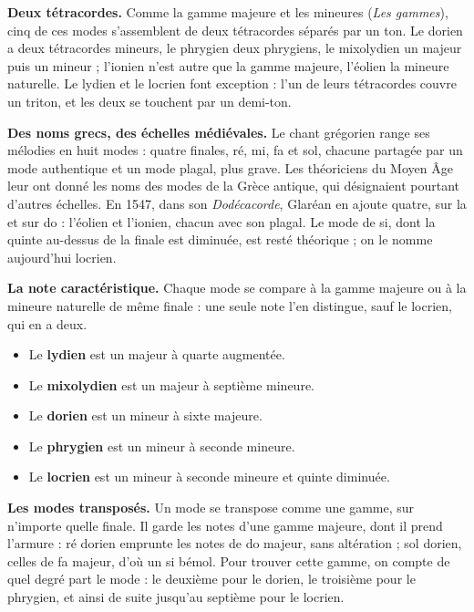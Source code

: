 \documentclass[a4paper,11pt]{article}
\begin{document}
\textbf{Deux tétracordes.} Comme la gamme majeure et les mineures
(\emph{Les gammes}), cinq de ces modes s'assemblent de deux tétracordes
séparés par un ton. Le dorien a deux tétracordes mineurs, le phrygien deux
phrygiens, le mixolydien un majeur puis un mineur ; l'ionien n'est autre que la
gamme majeure, l'éolien la mineure naturelle. Le lydien et le locrien font
exception : l'un de leurs tétracordes couvre un triton, et les deux se touchent
par un demi-ton.

\begin{remarque}
\textbf{Des noms grecs, des échelles médiévales.} Le chant grégorien range
ses mélodies en huit modes : quatre finales, ré, mi, fa et sol, chacune
partagée par un mode authentique et un mode plagal, plus grave. Les
théoriciens du Moyen Âge leur ont donné les noms des modes de la Grèce
antique, qui désignaient pourtant d'autres échelles. En 1547, dans son
\emph{Dodécacorde}, Glaréan en ajoute quatre, sur la et sur do : l'éolien et
l'ionien, chacun avec son plagal. Le mode de si, dont la quinte au-dessus de la
finale est diminuée, est resté théorique ; on le nomme aujourd'hui locrien.
\end{remarque}

\textbf{La note caractéristique.} Chaque mode se compare à la gamme majeure ou
à la mineure naturelle de même finale : une seule note l'en distingue, sauf le
locrien, qui en a deux.
\begin{itemize}
  \item Le \textbf{lydien} est un majeur à quarte augmentée.
  \item Le \textbf{mixolydien} est un majeur à septième mineure.
  \item Le \textbf{dorien} est un mineur à sixte majeure.
  \item Le \textbf{phrygien} est un mineur à seconde mineure.
  \item Le \textbf{locrien} est un mineur à seconde mineure et quinte diminuée.
\end{itemize}

\textbf{Les modes transposés.} Un mode se transpose comme une gamme, sur
n'importe quelle finale. Il garde les notes d'une gamme majeure, dont il prend
l'armure : ré dorien emprunte les notes de do majeur, sans altération ; sol
dorien, celles de fa majeur, d'où un si bémol. Pour trouver cette gamme, on
compte de quel degré part le mode : le deuxième pour le dorien, le troisième
pour le phrygien, et ainsi de suite jusqu'au septième pour le locrien.
\end{document}
